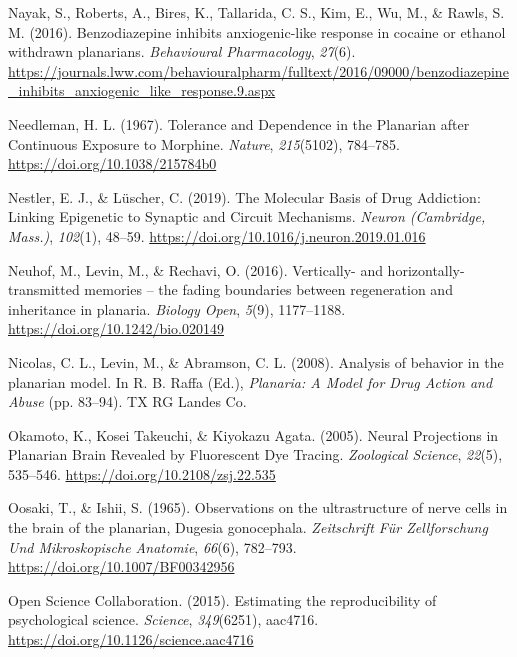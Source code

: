 \documentclass[
  jou,
  floatsintext,
  longtable,
  nolmodern,
  notxfonts,
  notimes,
  donotrepeattitle,
  colorlinks=true,linkcolor=blue,citecolor=blue,urlcolor=blue]{apa7}
\newlength{\cslhangindent}
\newenvironment{CSLReferences}[2] %
 {\begin{list}{}{%
  \setlength{\itemindent}{0pt}
  \setlength{\leftmargin}{0pt}
  \setlength{\parsep}{0pt}
  \ifodd #1
   \setlength{\leftmargin}{\cslhangindent}
   \setlength{\itemindent}{-1\cslhangindent}
  \fi
  \setlength{\itemsep}{#2\baselineskip}}}
 {\end{list}}
\begin{document}
\begin{CSLReferences}{1}{0}
Nayak, S., Roberts, A., Bires, K., Tallarida, C. S., Kim, E., Wu, M., \&
Rawls, S. M. (2016). Benzodiazepine inhibits anxiogenic-like response in
cocaine or ethanol withdrawn planarians. \emph{Behavioural
Pharmacology}, \emph{27}(6).
\url{https://journals.lww.com/behaviouralpharm/fulltext/2016/09000/benzodiazepine_inhibits_anxiogenic_like_response.9.aspx}

Needleman, H. L. (1967). Tolerance and {Dependence} in the {Planarian}
after {Continuous} {Exposure} to {Morphine}. \emph{Nature},
\emph{215}(5102), 784--785. \url{https://doi.org/10.1038/215784b0}

Nestler, E. J., \& Lüscher, C. (2019). The {Molecular} {Basis} of {Drug}
{Addiction}: {Linking} {Epigenetic} to {Synaptic} and {Circuit}
{Mechanisms}. \emph{Neuron (Cambridge, Mass.)}, \emph{102}(1), 48--59.
\url{https://doi.org/10.1016/j.neuron.2019.01.016}

Neuhof, M., Levin, M., \& Rechavi, O. (2016). Vertically- and
horizontally-transmitted memories -- the fading boundaries between
regeneration and inheritance in planaria. \emph{Biology Open},
\emph{5}(9), 1177--1188. \url{https://doi.org/10.1242/bio.020149}

Nicolas, C. L., Levin, M., \& Abramson, C. L. (2008). Analysis of
behavior in the planarian model. In R. B. Raffa (Ed.), \emph{Planaria:
{A} {Model} for {Drug} {Action} and {Abuse}} (pp. 83--94). TX RG Landes
Co.

Okamoto, K., Kosei Takeuchi, \& Kiyokazu Agata. (2005). Neural
{Projections} in {Planarian} {Brain} {Revealed} by {Fluorescent} {Dye}
{Tracing}. \emph{Zoological Science}, \emph{22}(5), 535--546.
\url{https://doi.org/10.2108/zsj.22.535}

Oosaki, T., \& Ishii, S. (1965). Observations on the ultrastructure of
nerve cells in the brain of the planarian, {Dugesia} gonocephala.
\emph{Zeitschrift Für Zellforschung Und Mikroskopische Anatomie},
\emph{66}(6), 782--793. \url{https://doi.org/10.1007/BF00342956}

Open Science Collaboration. (2015). Estimating the reproducibility of
psychological science. \emph{Science}, \emph{349}(6251), aac4716.
\url{https://doi.org/10.1126/science.aac4716}


\end{CSLReferences}
\end{document}
